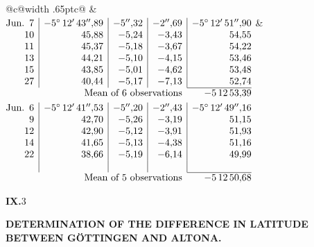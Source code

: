 \noindent\begin{tabular}{@{}c@{\hspace{.4em}\vrule width .65pt\hspace{.4em}}c@{}}
 &
 \\[.18ex]
\(\begin{array}[t]{@{}r|r|r|r|r@{}}
\text{Jun.}\enspace 7 & -5^\circ\,12'\,43''{,}89 & -5''{,}32 & -2''{,}69 & -5^\circ\,12'\,51''{,}90\\
10 & 45{,}88 & -5{,}24 & -3{,}43 & 54{,}55\\
11 & 45{,}37 & -5{,}18 & -3{,}67 & 54{,}22\\
13 & 44{,}21 & -5{,}10 & -4{,}15 & 53{,}46\\
15 & 43{,}85 & -5{,}01 & -4{,}62 & 53{,}48\\
27 & 40{,}44 & -5{,}17 & -7{,}13 & 52{,}74\\
\cline{5-5}
\multicolumn{4}{r}{\text{Mean of 6 observations}} & -5\,12\,53{,}39
\end{array}\)
&
\(\begin{array}[t]{@{}r|r|r|r|r@{}}
\text{Jun.}\enspace 6 & -5^\circ\,12'\,41''{,}53 & -5''{,}20 & -2''{,}43 & -5^\circ\,12'\,49''{,}16\\
9 & 42{,}70 & -5{,}26 & -3{,}19 & 51{,}15\\
12 & 42{,}90 & -5{,}12 & -3{,}91 & 51{,}93\\
14 & 41{,}65 & -5{,}13 & -4{,}38 & 51{,}16\\
22 & 38{,}66 & -5{,}19 & -6{,}14 & 49{,}99\\
 & & & & \\
\cline{5-5}
\multicolumn{4}{r}{\text{Mean of 5 observations}} & -5\,12\,50{,}68
\end{array}\)
\end{tabular}\par\medskip
\noindent\textbf{IX.}\hfill 3\hspace{.12\textwidth}\par

\par\clearpage
\noindent{}\parbox[t]{\dimexpr\linewidth-24mm\relax}{\centering\scriptsize\bfseries DETERMINATION OF THE DIFFERENCE IN LATITUDE BETWEEN GÖTTINGEN AND ALTONA.}\makebox[12mm][r]{}\par\medskip

